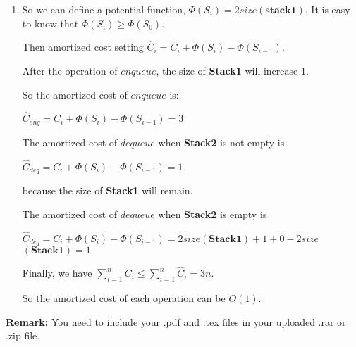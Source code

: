 \documentclass[12pt,a4paper]{article}
\makeatletter
\newtheorem*{solution}{Solution}
\theoremstyle{definition}
\renewenvironment{solution}[1][Solution] {\par\pushQED{\qed}\normalfont\topsep6\p@\@plus6\p@\relax\trivlist\item[\hskip\labelsep\bfseries#1\@addpunct{.}]\ignorespaces}{\popQED\endtrivlist\@endpefalse} \makeatother
\makeatother
\begin{document}
\begin{enumerate}
\begin{solution}
       So we can define a potential function, $\Phi(S_i)=2$$size$$(\textbf{stack1})$. It is easy to know that $\Phi(S_i)\ge\Phi(S_0)$.
       
       Then amortized cost setting $\hat{C}_{i}=C_{i}+\Phi(S_i)-\Phi(S_{i-1})$.
    	
    	After the operation of $enqueue$, the size of \textbf{Stack1} will increase 1.
    	
      So the amortized cost of $enqueue$ is:
      
      $\hat{C}_{enq}=C_{i}+\Phi(S_i)-\Phi(S_{i-1})=3$ 
      
       The amortized cost of $dequeue$ when \textbf{Stack2} is not empty is 
       
        $\hat{C}_{deq}=C_{i}+\Phi(S_i)-\Phi(S_{i-1})=1$
        
        because the size of \textbf{Stack1} will remain.
        
         The amortized cost of $dequeue$ when \textbf{Stack2} is empty is 
        
        $\hat{C}_{deq}=C_{i}+\Phi(S_i)-\Phi(S_{i-1})=2$$size$$(\textbf{Stack1})+1+0-2$$size$$(\textbf{Stack1})=1$
        
        Finally, we have $\sum_{i=1}^nC_i\le\sum_{i=1}^n\hat{C}_i=3n$.
        
        So the amortized cost of each operation can be $O(1)$.
    \end{solution}


\end{enumerate}

\vspace{20pt}

\textbf{Remark:} You need to include your .pdf and .tex files in your uploaded .rar or .zip file.

\end{document}
